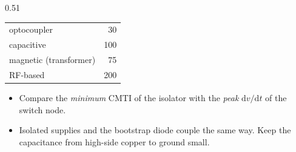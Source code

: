 \begin{frame}
\begin{columns}[T]
\begin{column}{0.51\textwidth}
\begin{table}
\begin{tabular}{|l|r|}
					optocoupler                                      & 30            \\
					capacitive                                       & 100           \\
					magnetic (transformer)                           & 75            \\
					RF-based                                         & 200           \\
					\hline
				\end{tabular}
			\end{table}
			\small
			\begin{itemize}
				\item Compare the \emph{minimum} CMTI of the isolator with the \emph{peak} $\mathrm{d}v/\mathrm{d}t$ of the switch node.
				\item Isolated supplies and the bootstrap diode couple the same way. Keep the capacitance from high-side copper to ground small.
			\end{itemize}
		\end{column}
	\end{columns}
\end{frame}

